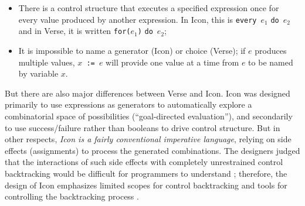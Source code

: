 \documentclass[acmsmall]{acmart}
\newcommand{\Varid}[1]{\mathit{#1}}
\begin{document}
\begin{itemize}
\item There is a control structure that executes a specified expression once for every value produced by another expression.
  In Icon, this is \texttt{every}~\ensuremath{\Varid{e}_{\mathrm{1}}} \texttt{do}~\ensuremath{\Varid{e}_{\mathrm{2}}} and in Verse, it is written \texttt{for(}\ensuremath{\Varid{e}_{\mathrm{1}}}\texttt{)} \texttt{do}~\ensuremath{\Varid{e}_{\mathrm{2}}};
\item It is impossible to name a generator (Icon) or choice (Verse); if \ensuremath{\Varid{e}} produces multiple values,
  \texttt{\ensuremath{\Varid{x}}~:=~\ensuremath{\Varid{e}}} will provide one value at a time from \ensuremath{\Varid{e}} to be named by variable \ensuremath{\Varid{x}}.
\end{itemize}

But there are also major differences between Verse and Icon.
Icon was designed primarily to use expressions as generators to automatically
explore a combinatorial space of possibilities (``goal-directed evaluation''), and secondarily to use
success/failure rather than booleans to drive control structure.
But in other respects, \emph{Icon is a fairly conventional imperative language}, relying
on side effects (assignments) to process the generated combinations.
The designers judged that the interactions of such side effects with completely
unrestrained control backtracking would be difficult for programmers to
understand \cite[\S 3.1]{griswold:generators-in-icon}; therefore, the design of Icon emphasizes limited scopes for control
backtracking and tools for controlling the backtracking process \cite[\S 3.3]{griswold:generators-in-icon}.
\end{document}
